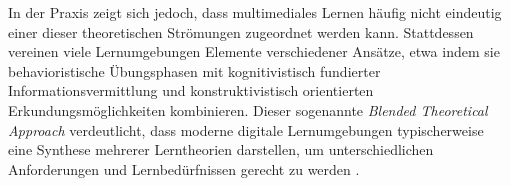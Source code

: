 In der Praxis zeigt sich jedoch, dass multimediales Lernen häufig nicht eindeutig einer dieser theoretischen Strömungen zugeordnet werden kann. Stattdessen vereinen viele Lernumgebungen Elemente verschiedener Ansätze, etwa indem sie behavioristische Übungsphasen mit kognitivistisch fundierter Informationsvermittlung und konstruktivistisch orientierten Erkundungsmöglichkeiten kombinieren. Dieser sogenannte \textit{Blended Theoretical Approach} verdeutlicht, dass moderne digitale Lernumgebungen typischerweise eine Synthese mehrerer Lerntheorien darstellen, um unterschiedlichen Anforderungen und Lernbedürfnissen gerecht zu werden \parencites[S.~186]{picciano_theories_2021}[S.~37]{liu_theoretical_2024}.

